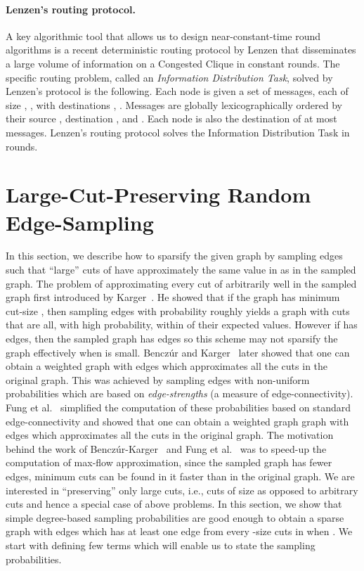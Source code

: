 \documentclass[11pt]{article}
\begin{document}
\paragraph{Lenzen's routing protocol.}
A key algorithmic tool that allows us to design near-constant-time round 
algorithms is a recent deterministic routing protocol by Lenzen 
\cite{lenzen2013routing} that disseminates a large volume of information 
on a Congested Clique in constant rounds.
The specific routing problem, called an \textit{Information Distribution Task},
solved by Lenzen's protocol is the following.
Each node  is given a set of  messages, each of size , ,
with destinations , .
Messages are globally lexicographically ordered by their source , destination , and .
Each node is also the destination of at most  messages.
Lenzen's routing protocol solves the Information Distribution Task in  rounds.

\section{Large-Cut-Preserving Random Edge-Sampling}
\label{sec:cut}
In this section, we describe how to sparsify the given graph  by sampling edges such that ``large'' cuts of  have approximately the same value in  as in the sampled graph. 
The problem of approximating every cut of  arbitrarily well in the sampled graph first introduced by Karger~\cite{karger1994stoc}. 
He showed that if the graph has minimum cut-size , then sampling edges with probability roughly  yields a graph with cuts that are all, with high probability, within  of their expected values. 
However if  has  edges, then the sampled graph has  edges so this scheme may not sparsify the graph effectively when  is small. 
Bencz\'{u}r and Karger~\cite{benczurKarger2002arxiv, benczurKarger1996stoc} later showed that one can obtain a weighted graph with  edges which approximates all the cuts in the original graph. 
This was achieved by sampling edges with non-uniform probabilities which are based on \textit{edge-strengths} (a measure of edge-connectivity). 
Fung et al.~\cite{fung2011stoc} simplified the computation of these probabilities based on standard edge-connectivity and showed that one can obtain a weighted graph graph with  edges which approximates all the cuts in the original graph.  
The motivation behind the work of Bencz\'{u}r-Karger~\cite{benczurKarger1996stoc, benczurKarger2002arxiv} and Fung et al.~\cite{fung2011stoc} was to speed-up the computation of max-flow approximation, since the sampled graph has fewer edges, minimum cuts can be found in it faster than in the original graph. 
We are interested in ``preserving'' only large cuts, i.e., cuts of size  as opposed to arbitrary cuts and hence a special case of above problems. 
In this section, we show that simple degree-based sampling probabilities are good enough to obtain a sparse graph with  edges which has at least one edge from every -size cuts in  when . 
We start with defining few terms which will enable us to state the sampling probabilities.  
\end{document}
